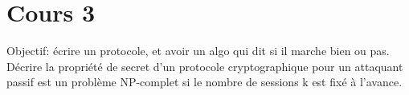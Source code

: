 \section{Cours 3}
Objectif: écrire un protocole, et avoir un algo qui dit si il marche bien ou pas.\\
Décrire la propriété de secret d'un protocole cryptographique pour un attaquant passif est un problème NP-complet si
le nombre de sessions k est fixé à l'avance.
